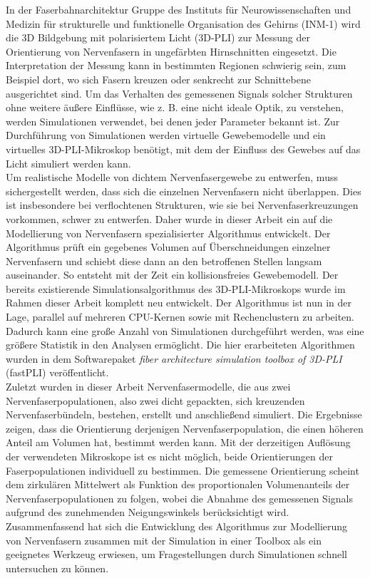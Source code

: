 %
%
%
{
\let\cleardoublepage\clearpage
{}
}
%
In der Faserbahnarchitektur Gruppe des Instituts für Neurowissenschaften und Medizin für strukturelle und funktionelle Organisation des Gehirns (INM-1) wird die 3D Bildgebung mit polarisiertem Licht (3D-PLI) zur Messung der Orientierung von Nervenfasern in ungefärbten Hirnschnitten eingesetzt.
Die Interpretation der Messung kann in bestimmten Regionen schwierig sein, zum Beispiel dort, wo sich Fasern kreuzen oder senkrecht zur Schnittebene ausgerichtet sind.
Um das Verhalten des gemessenen Signals solcher Strukturen ohne weitere äußere Einflüsse, wie z. B. eine nicht ideale Optik, zu verstehen, werden Simulationen verwendet, bei denen jeder Parameter bekannt ist.
Zur Durchführung von Simulationen werden virtuelle Gewebemodelle und ein virtuelles 3D-PLI-Mikroskop benötigt, mit dem der Einfluss des Gewebes auf das Licht simuliert werden kann.
\\
%
Um realistische Modelle von dichtem Nervenfasergewebe zu entwerfen, muss sichergestellt werden, dass sich die einzelnen Nervenfasern nicht überlappen.
Dies ist insbesondere bei verflochtenen Strukturen, wie sie bei Nervenfaserkreuzungen vorkommen, schwer zu entwerfen.
Daher wurde in dieser Arbeit ein auf die Modellierung von Nervenfasern spezialisierter Algorithmus entwickelt.
Der Algorithmus prüft ein gegebenes Volumen auf Überschneidungen einzelner Nervenfasern und schiebt diese dann an den betroffenen Stellen langsam auseinander.
So entsteht mit der Zeit ein kollisionsfreies Gewebemodell.
Der bereits existierende Simulationsalgorithmus des 3D-PLI-Mikroskops wurde im Rahmen dieser Arbeit komplett neu entwickelt.
Der Algorithmus ist nun in der Lage, parallel auf mehreren CPU-Kernen sowie mit Rechenclustern zu arbeiten.
Dadurch kann eine große Anzahl von Simulationen durchgeführt werden, was eine größere Statistik in den Analysen ermöglicht.
Die hier erarbeiteten Algorithmen wurden in dem Softwarepaket \textit{fiber architecture simulation toolbox of 3D-PLI} (fastPLI) veröffentlicht.
\\
%
Zuletzt wurden in dieser Arbeit Nervenfasermodelle, die aus zwei Nervenfaserpopulationen, also zwei dicht gepackten, sich kreuzenden Nervenfaserbündeln, bestehen, erstellt und anschließend simuliert.
Die Ergebnisse zeigen, dass die Orientierung derjenigen Nervenfaserpopulation, die einen höheren Anteil am Volumen hat, bestimmt werden kann.
Mit der derzeitigen Auflösung der verwendeten Mikroskope ist es nicht möglich, beide Orientierungen der Faserpopulationen individuell zu bestimmen.
Die gemessene Orientierung scheint dem zirkulären Mittelwert als Funktion des proportionalen Volumenanteils der Nervenfaserpopulationen zu folgen, wobei die Abnahme des gemessenen Signals aufgrund des zunehmenden Neigungswinkels berücksichtigt wird.
Zusammenfassend hat sich die Entwicklung des Algorithmus zur Modellierung von Nervenfasern zusammen mit der Simulation in einer Toolbox als ein geeignetes Werkzeug erwiesen, um Fragestellungen durch Simulationen schnell untersuchen zu können.